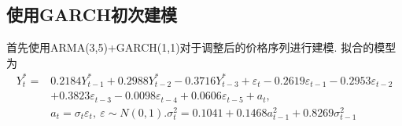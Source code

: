 \documentclass[12pt]{article}
\begin{document}
\subsection{使用GARCH初次建模}
\qquad 首先使用ARMA(3,5)+GARCH(1,1)对于调整后的价格序列进行建模. 拟合的模型为
\[
    \begin{aligned}
        Y_{t}^*=&0.2184 Y_{t-1}^*+ 0.2988 Y_{t-2}^*-0.3716 Y_{t-3}^*+\varepsilon_{t}-0.2619\varepsilon_{t-1}-0.2953\varepsilon_{t-2}\\&+0.3823\varepsilon_{t-3}-0.0098\varepsilon_{t-4}+0.0606\varepsilon_{t-5}+a_{t},\\&a_{t}=\sigma_{t} \varepsilon_{t},\ \varepsilon\sim N(0,1).
        \sigma_{t}^{2} =0.1041+  0.1468 a_{t-1}^{2}+0.8269 \sigma_{t-1}^{2}
    \end{aligned}
\]
\end{document}
